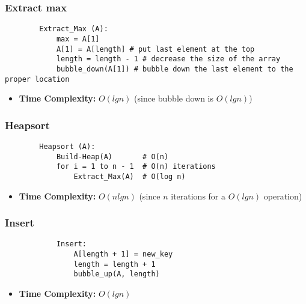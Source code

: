     \subsubsection{Extract max}
    \begin{definition}
        \begin{lstlisting}
        Extract_Max (A): 
            max = A[1]
            A[1] = A[length] # put last element at the top
            length = length - 1 # decrease the size of the array
            bubble_down(A[1]) # bubble down the last element to the proper location
        \end{lstlisting}
        \begin{itemize}
            \item \textbf{Time Complexity:} $O(lg n)$ (since bubble down is $O(lg n)$)
        \end{itemize}
    \end{definition}

    \subsubsection{Heapsort}
    \begin{definition}
        \begin{lstlisting}
        Heapsort (A):
            Build-Heap(A)       # O(n)
            for i = 1 to n - 1  # O(n) iterations
                Extract_Max(A)  # O(log n)
        \end{lstlisting}
        \begin{itemize}
            \item \textbf{Time Complexity:} $O(nlg n)$ (since $n$ iterations for a $O(lg n)$ operation)
        \end{itemize}

    \end{definition}

    \subsubsection{Insert}
    \begin{definition}
        \begin{lstlisting}
            Insert:
                A[length + 1] = new_key
                length = length + 1
                bubble_up(A, length)
        \end{lstlisting}
        \begin{itemize}
            \item \textbf{Time Complexity:} $O(lg n)$
        \end{itemize}
    \end{definition}

